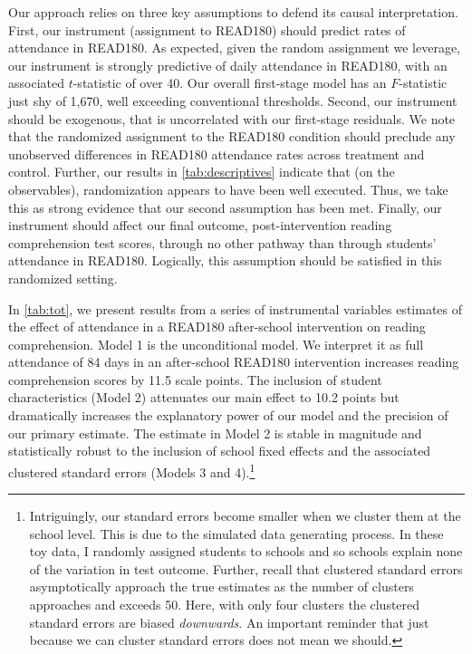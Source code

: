 \documentclass[a4paper, 11pt]{article}
\begin{document}
\begin{enumerate}
	Our approach relies on three key assumptions to defend its causal interpretation. First, our instrument (assignment to READ180) should predict rates of attendance in READ180. As expected, given the random assignment we leverage, our instrument is strongly predictive of daily attendance in READ180, with an associated $t$-statistic of over 40. Our overall first-stage model has an $F$-statistic just shy of 1,670, well exceeding conventional thresholds. Second, our instrument should be exogenous, that is uncorrelated with our first-stage residuals. We note that the randomized assignment to the READ180 condition should preclude any unobserved differences in READ180 attendance rates across treatment and control. Further, our results in \autoref{tab:descriptives} indicate that (on the observables), randomization appears to have been well executed. Thus, we take this as strong evidence that our second assumption has been met. Finally, our instrument should affect our final outcome, post-intervention reading comprehension test scores, through no other pathway than through students' attendance in READ180. Logically, this assumption should be satisfied in this randomized setting.
	
	In \autoref{tab:tot}, we present results from a series of instrumental variables estimates of the effect of attendance in a READ180 after-school intervention on reading comprehension. Model 1 is the unconditional model. We interpret it as full attendance of 84 days in an after-school READ180 intervention increases reading comprehension scores by 11.5 scale points. The inclusion of student characteristics (Model 2) attenuates our main effect to 10.2 points but dramatically increases the explanatory power of our model and the precision of our primary estimate. The estimate in Model 2 is stable in magnitude and statistically robust to the inclusion of school fixed effects and the associated clustered standard errors (Models 3 and 4).\footnote{Intriguingly, our standard errors become smaller when we cluster them at the school level. This is due to the simulated data generating process. In these toy data, I randomly assigned students to schools and so schools explain none of the variation in test outcome. Further, recall that clustered standard errors asymptotically approach the true estimates as the number of clusters approaches and exceeds 50. Here, with only four clusters the clustered standard errors are biased \textit{downwards}. An important reminder that just because we can cluster standard errors does not mean we should.}


\end{enumerate}
\end{document}
